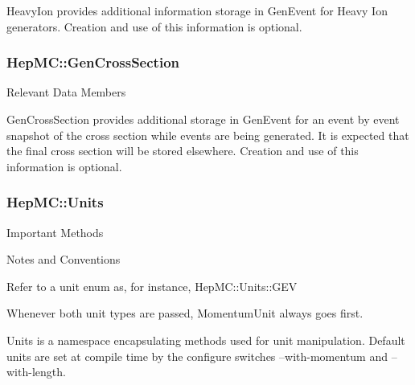 \documentclass[11pt,letterpaper]{article}
\begin{document}
HeavyIon provides additional information storage in GenEvent for Heavy Ion
generators.  Creation and use of this information is optional. 


%
%

\subsubsection{HepMC::GenCrossSection}
\begin{myitemize}{Relevant Data Members}
\end{myitemize}

GenCrossSection provides additional storage in GenEvent for an event by event 
snapshot of the cross section while events are being generated.
It is expected that the final cross section will be stored elsewhere.
Creation and use of this information is optional. 

%
%

\subsubsection{HepMC::Units}
\begin{myitemize}{Important Methods}
\end{myitemize}
\begin{myitemize}{Notes and Conventions}
  \item Refer to a unit enum as, for instance, HepMC::Units::GEV
  \item Whenever both unit types are passed, MomentumUnit always goes first.
\end{myitemize}

Units is a namespace encapsulating methods used for unit manipulation.
Default units are set at compile time by the configure switches
--with-momentum and --with-length.  

%
%
\end{document}
